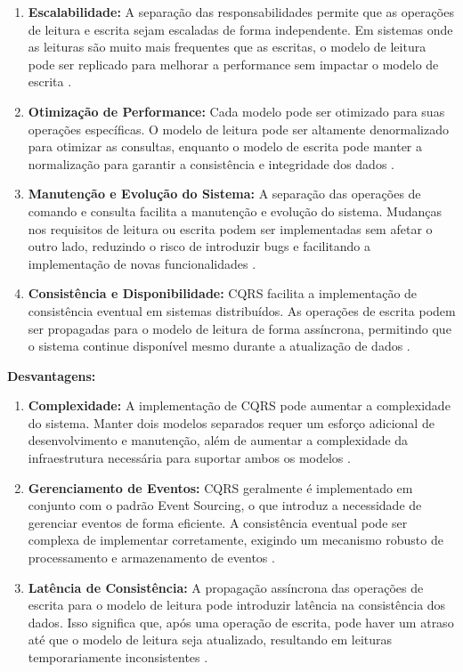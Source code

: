 \begin{enumerate}
    \item \textbf{Escalabilidade:} A separação das responsabilidades permite que as operações de leitura e escrita sejam escaladas de forma independente. Em sistemas onde as leituras são muito mais frequentes que as escritas, o modelo de leitura pode ser replicado para melhorar a performance sem impactar o modelo de escrita \cite{richardson2018}.
    \item \textbf{Otimização de Performance:} Cada modelo pode ser otimizado para suas operações específicas. O modelo de leitura pode ser altamente denormalizado para otimizar as consultas, enquanto o modelo de escrita pode manter a normalização para garantir a consistência e integridade dos dados \cite{fowler2011}.
    \item \textbf{Manutenção e Evolução do Sistema:} A separação das operações de comando e consulta facilita a manutenção e evolução do sistema. Mudanças nos requisitos de leitura ou escrita podem ser implementadas sem afetar o outro lado, reduzindo o risco de introduzir bugs e facilitando a implementação de novas funcionalidades \cite{young2010}.
    \item \textbf{Consistência e Disponibilidade:} CQRS facilita a implementação de consistência eventual em sistemas distribuídos. As operações de escrita podem ser propagadas para o modelo de leitura de forma assíncrona, permitindo que o sistema continue disponível mesmo durante a atualização de dados \cite{richardson2018}.
\end{enumerate}

\textbf{Desvantagens:}

\begin{enumerate}
    \item \textbf{Complexidade:} A implementação de CQRS pode aumentar a complexidade do sistema. Manter dois modelos separados requer um esforço adicional de desenvolvimento e manutenção, além de aumentar a complexidade da infraestrutura necessária para suportar ambos os modelos \cite{fowler2011}.
    \item \textbf{Gerenciamento de Eventos:} CQRS geralmente é implementado em conjunto com o padrão Event Sourcing, o que introduz a necessidade de gerenciar eventos de forma eficiente. A consistência eventual pode ser complexa de implementar corretamente, exigindo um mecanismo robusto de processamento e armazenamento de eventos \cite{young2010}.
    \item \textbf{Latência de Consistência:} A propagação assíncrona das operações de escrita para o modelo de leitura pode introduzir latência na consistência dos dados. Isso significa que, após uma operação de escrita, pode haver um atraso até que o modelo de leitura seja atualizado, resultando em leituras temporariamente inconsistentes \cite{richardson2018}.
\end{enumerate}

